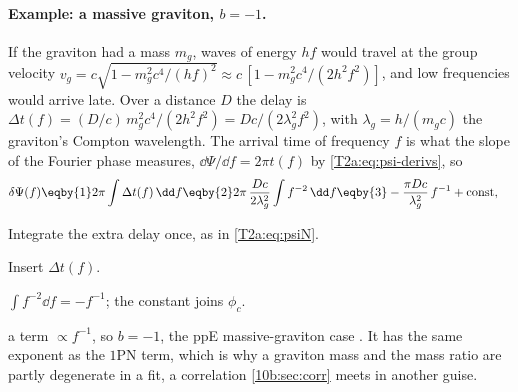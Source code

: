 \paragraph{Example: a massive graviton, $b=-1$.}
If the graviton had a mass $m_g$, waves of energy $hf$ would travel at the group velocity $v_g=c\sqrt{1-m_g^2c^4/(hf)^2}\approx c\,[1-m_g^2c^4/(2h^2f^2)]$, and low frequencies would arrive late. Over a distance $D$ the delay is $\Delta t(f)=(D/c)\,m_g^2c^4/(2h^2f^2)=Dc/(2\lambda_g^2f^2)$, with $\lambda_g=h/(m_gc)$ the graviton's Compton wavelength. The arrival time of frequency $f$ is what the slope of the Fourier phase measures, $\dd\Psi/\dd f=2\pi t(f)$ by \eqref{T2a:eq:psi-derivs}, so
\begin{align}
  \delta\Psi(f)&\eqby{1}2\pi\int\Delta t(f)\,\dd f
  \eqby{2}2\pi\,\frac{Dc}{2\lambda_g^2}\int f^{-2}\,\dd f
  \eqby{3}-\frac{\pi Dc}{\lambda_g^2}\,f^{-1}+\text{const},
\end{align}
\begin{explain}
  \item Integrate the extra delay once, as in \eqref{T2a:eq:psiN}.
  \item Insert $\Delta t(f)$.
  \item $\int f^{-2}\dd f=-f^{-1}$; the constant joins $\phi_c$.
\end{explain}
a term $\propto f^{-1}$, so $b=-1$, the ppE massive-graviton case \cite{YunesPretorius2009}. It has the same exponent as the $1$PN term, which is why a graviton mass and the mass ratio are partly degenerate in a fit, a correlation \cref{10b:sec:corr} meets in another guise.

